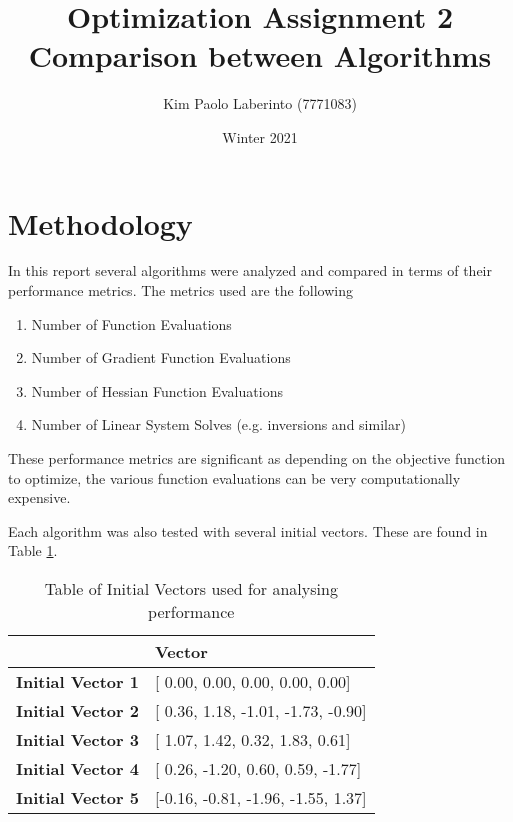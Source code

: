 \documentclass{article}
\title{Optimization Assignment 2\\Comparison between Algorithms}
\date{Winter 2021}
\author{Kim Paolo Laberinto (7771083)}
\begin{document}
    \maketitle
    \newpage

    \tableofcontents
    \newpage


    \section{Methodology}

    In this report several algorithms were analyzed and compared in terms of their performance metrics.
    The metrics used are the following
    \begin{enumerate}
        \item Number of Function Evaluations
        \item Number of Gradient Function Evaluations
        \item Number of Hessian Function Evaluations
        \item Number of Linear System Solves (e.g. inversions and similar)
    \end{enumerate}

    These performance metrics are significant as depending on the objective function to optimize, 
    the various function evaluations can be very computationally expensive.

    Each algorithm was also tested with several initial vectors. These are found in Table \ref{tab:initial_vectors}.

    \begin{table}[H]
        \centering
        \begin{tabular}{@{}ll@{}}
        \toprule
                                  & \textbf{Vector}                     \\ \midrule
        \textbf{Initial Vector 1} & [ 0.00,  0.00,  0.00,  0.00,  0.00] \\
        \textbf{Initial Vector 2} & [ 0.36,  1.18, -1.01, -1.73, -0.90] \\
        \textbf{Initial Vector 3} & [ 1.07,  1.42,  0.32,  1.83,  0.61] \\
        \textbf{Initial Vector 4} & [ 0.26, -1.20,  0.60,  0.59, -1.77] \\
        \textbf{Initial Vector 5} & [-0.16, -0.81, -1.96, -1.55,  1.37] \\ \bottomrule
        \end{tabular}
        \caption{Table of Initial Vectors used for analysing performance}
        \label{tab:initial_vectors}
    \end{table}
\end{document}
